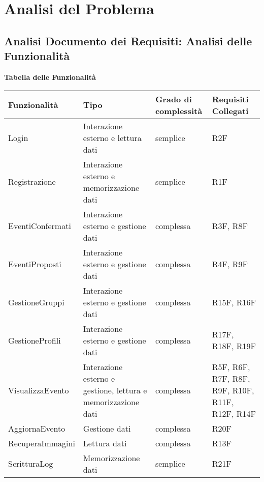 \newpage
\section{Analisi del Problema}
\subsection{Analisi Documento dei Requisiti: Analisi delle Funzionalità}
\hfill \break

\textbf{Tabella delle Funzionalità}
\hfill \break

\begin{tabular} {|P{3.8cm}|P{4.5cm}|P{2.5cm}|P{4cm}|}
    \hline
    \textbf{Funzionalità} & \textbf{Tipo}                                                 & \textbf{Grado di complessità} & \textbf{Requisiti Collegati}                    \\
    \hline
    Login                 & Interazione esterno e lettura dati                            & semplice                      & R2F                                             \\
    \hline
    Registrazione         & Interazione esterno e memorizzazione dati                     & semplice                      & R1F                                             \\
    \hline
    EventiConfermati      & Interazione esterno e gestione dati                           & complessa                     & R3F, R8F                                        \\
    \hline
    EventiProposti        & Interazione esterno e gestione dati                           & complessa                     & R4F, R9F                                        \\
    \hline
    GestioneGruppi        & Interazione esterno e gestione dati                           & complessa                     & R15F, R16F                                      \\
    \hline
    GestioneProfili       & Interazione esterno e gestione dati                           & complessa                     & R17F, R18F, R19F                                \\
    \hline
    VisualizzaEvento      & Interazione esterno e gestione, lettura e memorizzazione dati & complessa                     & R5F, R6F, R7F, R8F, R9F, R10F, R11F, R12F, R14F \\
    \hline
    AggiornaEvento        & Gestione dati                                                 & complessa                     & R20F                                            \\
    \hline
    RecuperaImmagini      & Lettura dati                                                  & complessa                     & R13F                                            \\
    \hline
    ScritturaLog          & Memorizzazione dati                                           & semplice                      & R21F                                            \\
    \hline
\end{tabular}


